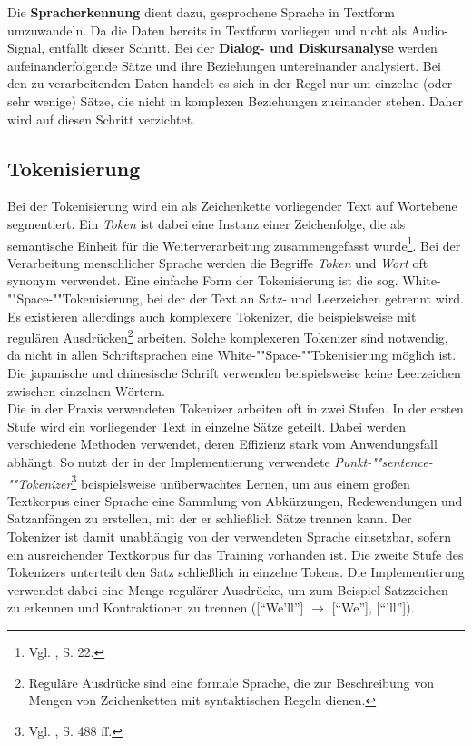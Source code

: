 \documentclass[
	a4paper,
	12pt,
	bibliography=totocnumbered,
	twoside,
]{scrreprt}
\begin{document}
Die \textbf{Spracherkennung} dient dazu, gesprochene Sprache in Textform umzuwandeln. Da die Daten bereits in Textform vorliegen und nicht als Audio-Signal, entfällt dieser Schritt. Bei der \textbf{Dialog- und Diskursanalyse} werden aufeinanderfolgende Sätze und ihre Beziehungen untereinander analysiert. Bei den zu verarbeitenden Daten handelt es sich in der Regel nur um einzelne (oder sehr wenige) Sätze, die nicht in komplexen Beziehungen zueinander stehen. Daher wird auf diesen Schritt verzichtet.


\subsection*{Tokenisierung}
\label{subsec:tokenisierung}
Bei der Tokenisierung wird ein als Zeichenkette vorliegender Text auf Wortebene segmentiert. Ein \textit{Token} ist dabei eine Instanz einer Zeichenfolge, die als semantische Einheit für die Weiterverarbeitung zusammengefasst wurde\footnote{Vgl. \citet{manning2008}, S. 22.}. Bei der Verarbeitung menschlicher Sprache werden die Begriffe \textit{Token} und \textit{Wort} oft synonym verwendet. Eine einfache Form der Tokenisierung ist die sog. White-""Space-""Tokenisierung, bei der der Text an Satz- und Leerzeichen getrennt wird. Es existieren allerdings auch komplexere Tokenizer, die beispielsweise mit regulären Ausdrücken\footnote{Reguläre Ausdrücke sind eine formale Sprache, die zur Beschreibung von Mengen von Zeichenketten mit syntaktischen Regeln dienen.} arbeiten. Solche komplexeren Tokenizer sind notwendig, da nicht in allen Schriftsprachen eine White-""Space-""Tokenisierung möglich ist. Die japanische und chinesische Schrift verwenden beispielsweise keine Leerzeichen zwischen einzelnen Wörtern.\\

Die in der Praxis verwendeten Tokenizer arbeiten oft in zwei Stufen. In der ersten Stufe wird ein vorliegender Text in einzelne Sätze geteilt. Dabei werden verschiedene Methoden verwendet, deren Effizienz stark vom Anwendungsfall abhängt. So nutzt der in der Implementierung verwendete \textit{Punkt-""sentence-""Tokenizer}\footnote{Vgl. \citet{kiss2006}, S. 488 ff.} beispielsweise unüberwachtes Lernen, um aus einem großen Textkorpus einer Sprache eine Sammlung von Abkürzungen, Redewendungen und Satzanfängen zu erstellen, mit der er schließlich Sätze trennen kann. Der Tokenizer ist damit unabhängig von der verwendeten Sprache einsetzbar, sofern ein ausreichender Textkorpus für das Training vorhanden ist. Die zweite Stufe des Tokenizers unterteilt den Satz schließlich in einzelne Tokens. Die Implementierung verwendet dabei eine Menge regulärer Ausdrücke, um zum Beispiel Satzzeichen zu erkennen und Kontraktionen zu trennen (["`We'll"'] $\rightarrow$ ["`We"'], ["`'ll"']).\\
\end{document}
